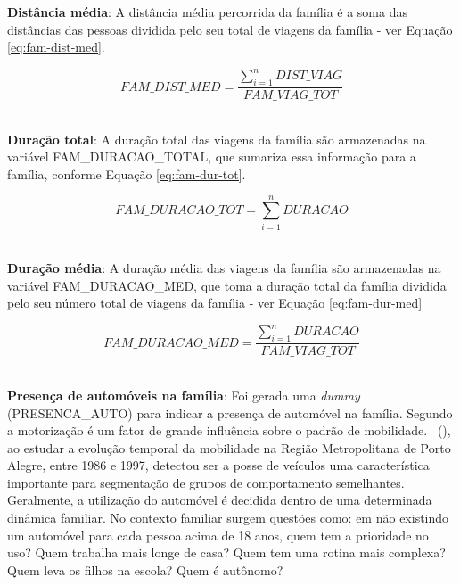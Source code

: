 \begin{compactitem}
\item \textbf{Distância média}:  A distância média percorrida da família é a soma das distâncias das pessoas dividida pelo seu total de viagens da família - ver Equação \eqref{eq:fam-dist-med}.

\begin{equation}\label{eq:fam-dist-med}
FAM\_DIST\_MED=\frac{\displaystyle\sum_{i=1}^{n}DIST\_VIAG}{FAM\_VIAG\_TOT}
\end{equation}\\

\item \textbf{Duração total}: A duração total das viagens da família são armazenadas na variável FAM_DURACAO_TOTAL, que sumariza essa informação para a família, conforme Equação \eqref{eq:fam-dur-tot}.

\begin{equation}\label{eq:fam-dur-tot}
FAM\_DURACAO\_TOT=\displaystyle\sum_{i=1}^{n}DURACAO
\end{equation}\\

\item \textbf{Duração média}: A duração média das viagens da família são armazenadas na variável FAM_DURACAO_MED, que toma a duração total da família dividida pelo seu número total de viagens da família - ver Equação \eqref{eq:fam-dur-med}

\begin{equation}\label{eq:fam-dur-med}
FAM\_DURACAO\_MED=\frac{\displaystyle\sum_{i=1}^{n}DURACAO}{FAM\_VIAG\_TOT}
\end{equation}\\

\item \textbf{Presença de automóveis na família}: Foi gerada uma \textit{dummy} (PRESENCA_AUTO) para indicar a presença de automóvel na família.
Segundo  a motorização é um fator de grande influência sobre o padrão de mobilidade. 
\ (\citeyear{PEIXOTO2002}), ao estudar a evolução temporal da mobilidade na Região Metropolitana de Porto Alegre, entre 1986 e 1997, detectou ser a posse de veículos uma característica importante para segmentação de grupos de comportamento semelhantes.
Geralmente, a utilização do automóvel é decidida dentro de uma determinada dinâmica familiar. %
No contexto familiar surgem questões como: em não existindo um automóvel para cada pessoa acima de 18 anos, quem tem a prioridade no uso? Quem trabalha mais longe de casa? Quem tem uma rotina mais complexa? Quem leva os filhos na escola? Quem é autônomo?\\


\end{compactitem}
